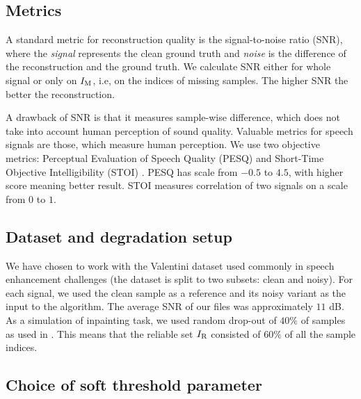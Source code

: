 \documentclass[conference]{IEEEtran}
\newcommand{\todo}[1]{\textcolor{red}{#1}}
\begin{document}
\subsection{Metrics}\label{subsec:metrics}


A standard metric for reconstruction quality is the signal-to-noise ratio (SNR), where the \textit{signal} represents the clean ground truth and \textit{noise} is the difference of the reconstruction and the ground truth.
We calculate SNR either for whole signal or only on $I_\textup{M}$, i.e, on the indices of missing samples.
The higher SNR the better the reconstruction.

A drawback of SNR is that it measures sample-wise difference, which does not take into account human perception of sound quality.
Valuable metrics for speech signals are those, which measure human perception.
We use two objective metrics: Perceptual Evaluation of Speech Quality (PESQ) \cite{Rix2001} and 
Short-Time Objective Intelligibility (STOI) \cite{Taal2010}.
PESQ has scale from $-0.5$ to $4.5$, with higher score meaning better result.
STOI measures correlation of two signals on a scale from $0$ to $1$.

\subsection{Dataset and degradation setup}
We have chosen to work with
the Valentini dataset \cite{ValentiniBotinhao2017} used commonly in speech enhancement challenges (the dataset is split to two subsets: clean and noisy).
For each signal, we used the clean sample as a reference and its noisy variant as the input to the algorithm. %
The average SNR of our files was approximately $11$ dB.
As a simulation of inpainting task, we used random drop-out of %
$40\%$ of samples as used in \cite{Mokry2021}.
This means that the reliable set $I_\textup{R}$ consisted of $60\%$ of all the sample indices.

\subsection{Choice of soft threshold parameter}\label{subsec:soft_thresh}
\end{document}
